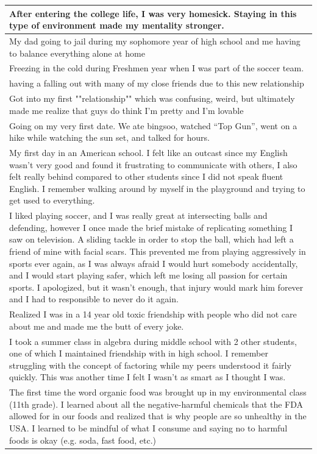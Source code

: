 \documentclass[
  .7em,
  letterpaper,
  DIV=11,
  numbers=noendperiod]{scrartcl}
\begin{document}
\begin{table}
\begin{tabular}{l}
\hline
After entering the college life, I was very homesick. Staying in this type of environment made my mentality stronger.\\
\hline
My dad going to jail during my sophomore year of high school and me having to balance everything alone at home\\
\hline
Freezing in the cold during Freshmen year when I was part of the soccer team.\\
\hline
having a falling out with many of my close friends due to this new relationship\\
\hline
Got into my first ""relationship"" which was confusing, weird, but ultimately made me realize that guys do think I'm pretty and I'm lovable\\
\hline
Going on my very first date. We ate bingsoo, watched “Top Gun”, went on a hike while watching the sun set, and talked for hours.\\
\hline
My first day in an American school. I felt like an outcast since my English wasn't very good and found it frustrating to communicate with others, I also felt really behind compared to other students since I did not speak fluent English. I remember walking around by myself in the playground and trying to get used to everything.\\
\hline
I liked playing soccer, and I was really great at intersecting balls and defending, however I once made the brief mistake of replicating something I saw on television. A sliding tackle in order to stop the ball, which had left a friend of mine with facial scars. This prevented me from playing aggressively in sports ever again, as I was always afraid I would hurt somebody accidentally, and I would start playing safer, which left me losing all passion for certain sports. I apologized, but it wasn't enough, that injury would mark him forever and I had to responsible to never do it again.\\
\hline
Realized I was in a 14 year old toxic friendship with people who did not care about me and made me the butt of every joke.\\
\hline
I took a summer class in algebra during middle school with 2 other students, one of which I maintained friendship with in high school. I remember struggling with the concept of factoring while my peers understood it fairly quickly. This was another time I felt I wasn't as smart as I thought I was.\\
\hline
The first time the word organic food was brought up in my environmental class (11th grade). I learned about all the negative-harmful chemicals that the FDA allowed for in our foods and realized that is why people are so unhealthy in the USA. I learned to be mindful of what I consume and saying no to harmful foods is okay (e.g. soda, fast food, etc.)\\

\end{tabular}
\end{table}
\end{document}
